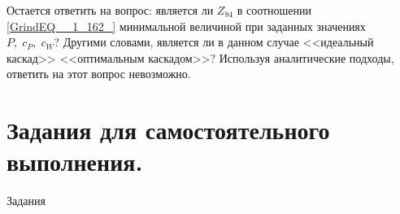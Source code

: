 Остается ответить на вопрос: является ли $Z_{84} $ в соотношении \ref{GrindEQ__1_162_} минимальной величиной при заданных значениях $P,\; c_{P} ,\; c_{W} $? Другими словами, является ли в данном случае <<идеальный каскад>> <<оптимальным каскадом>>? Используя аналитические подходы, ответить на этот вопрос невозможно.




\section{Задания для самостоятельного выполнения.}


Задания
